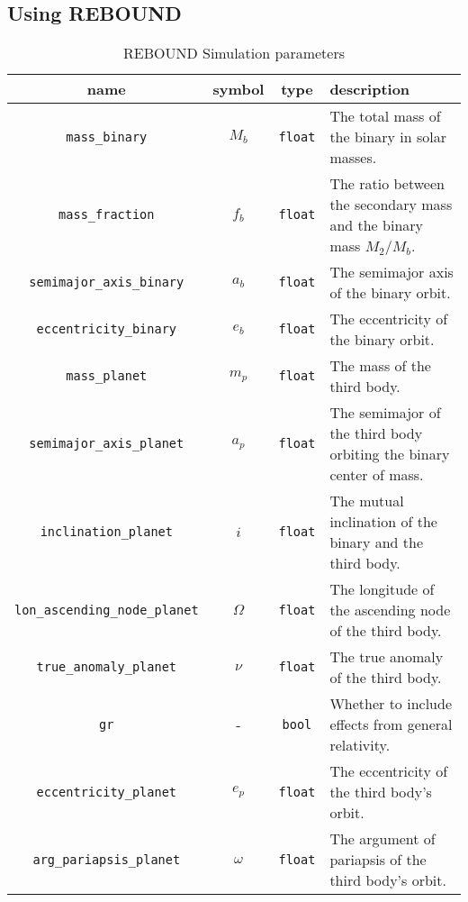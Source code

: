\documentclass[twocolumn]{aastex631}
\begin{document}
\subsection{Using {\sc REBOUND}}
\label{subsec:reb}

\begin{table*}
    \begin{tabular}{cccp{}}
        \hline
        name & symbol & type & description \\
        \hline
        \texttt{mass\_binary} & $M_b$ & \texttt{float} & The total mass of the binary in solar masses. \\
        \texttt{mass\_fraction} & $f_b$ & \texttt{float} & The ratio between the secondary mass and the binary mass $M_2/M_b$. \\
        \texttt{semimajor\_axis\_binary} & $a_b$ & \texttt{float} & The semimajor axis of the binary orbit. \\
        \texttt{eccentricity\_binary} & $e_b$ & \texttt{float} & The eccentricity of the binary orbit. \\
        \texttt{mass\_planet} & $m_p$ & \texttt{float} & The mass of the third body. \\
        \texttt{semimajor\_axis\_planet} & $a_p$ & \texttt{float} & The semimajor of the third body orbiting the binary center of mass. \\
        \texttt{inclination\_planet} & $i$ & \texttt{float} & The mutual inclination of the binary and the third body. \\
        \texttt{lon\_ascending\_node\_planet} & $\Omega$ & \texttt{float} & The longitude of the ascending node of the third body. \\
        \texttt{true\_anomaly\_planet} & $\nu$ & \texttt{float} & The true anomaly of the third body. \\
        \texttt{gr} & - & \texttt{bool} & Whether to include effects from general relativity. \\
        \texttt{eccentricity\_planet} & $e_p$ & \texttt{float} & The eccentricity of the third body's orbit. \\
        \texttt{arg\_pariapsis\_planet} & $\omega$ & \texttt{float} & The argument of pariapsis of the third body's orbit. \\
        \hline
    \end{tabular}
    \caption{ {\sc REBOUND} Simulation parameters}
    \label{tab:params}
\end{table*}
\end{document}
